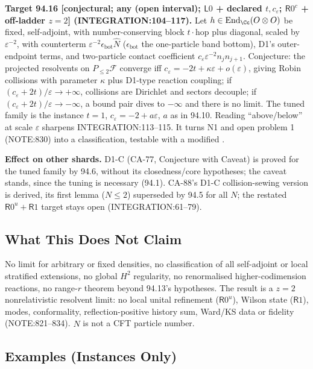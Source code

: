 \textbf{Target 94.16 [conjectural; any (open interval); \(\mathsf L0\) + declared \(t,c_\varepsilon\); \(\mathsf R0^{c}\) + off-ladder
\(z{=}2\)] (INTEGRATION:104--117).}  Let \(h\in\operatorname{End}_\Cc(O\otimes O)\) be fixed, self-adjoint, with number-conserving
block \(t\cdot\)hop plus diagonal, scaled by \(\varepsilon^{-2}\), with counterterm \(\varepsilon^{-2}\epsilon_{\mathrm{bot}}\hat N\) (\(\epsilon_{\mathrm{bot}}\) the one-particle band
bottom), D1's outer-endpoint terms, and two-particle contact coefficient \(c_\varepsilon\varepsilon^{-2}n_jn_{j+1}\).  Conjecture: the
projected resolvents on \(P_{\le2}\mathcal F\) converge iff \(c_\varepsilon=-2t+\kappa\varepsilon+o(\varepsilon)\), giving Robin collisions with
parameter \(\kappa\) plus D1-type reaction coupling; if \((c_\varepsilon+2t)/\varepsilon\to+\infty\), collisions are Dirichlet and sectors
decouple; if \((c_\varepsilon+2t)/\varepsilon\to-\infty\), a bound pair dives to \(-\infty\) and there is no limit.  The tuned family is the
instance \(t=1\), \(c_\varepsilon=-2+a\varepsilon\), \(a\) as in 94.10.  Reading ``above/below'' at scale \(\varepsilon\) sharpens INTEGRATION:113--115.
It turns N1 and open problem 1 (NOTE:830) into a classification, testable with a modified .

\textbf{Effect on other shards.}  D1-C (CA-77, Conjecture with Caveat) is proved for the tuned family by 94.6, without its
closedness/core hypotheses; the caveat stands, since the tuning is necessary (94.1).  CA-88's D1-C collision-sewing version is
derived, its first lemma (\(N\le2\)) superseded by 94.5 for all \(N\); the restated \(\mathsf R0^{u}+\mathsf R1\) target stays open (INTEGRATION:61--79).

\subsection{What This Does Not Claim}

No limit for arbitrary or fixed densities, no classification of all self-adjoint or local stratified extensions, no global
\(H^2\) regularity, no renormalised higher-codimension reactions, no range-\(r\) theorem beyond 94.13's hypotheses.  The result
is a \(z{=}2\) nonrelativistic resolvent limit: no local unital refinement (\(\mathsf R0^{u}\)), Wilson state (\(\mathsf R1\)), modes,
conformality, reflection-positive history sum, Ward/KS data or fidelity (NOTE:821--834).  \(\hat N\) is not a CFT particle number.

\subsection{Examples (Instances Only)}

